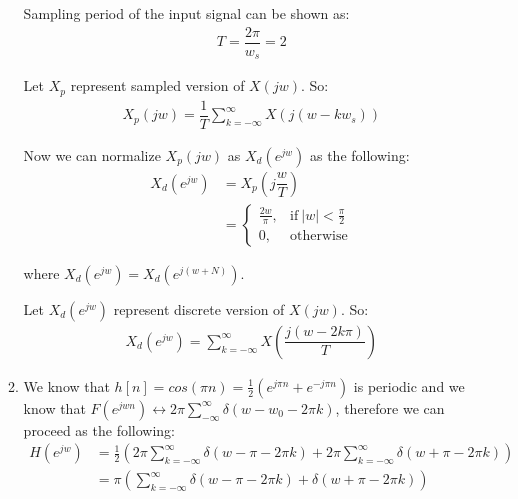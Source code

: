 \documentclass[10pt,a4paper, margin=1in]{article}
\begin{document}
\begin{enumerate}
\begin{enumerate}
    Sampling period of the input signal can be shown as: \\
    \begin{align*}
    T = \dfrac{2\pi}{w_s} = 2
    \end{align*}
    
    Let $X_p$ represent sampled version of $X(jw)$. So:
    \begin{align*}
    X_p(jw) = \dfrac{1}{T}\sum_{k = - \infty}^{\infty} X(j(w - kw_s))
    \end{align*}
    
    Now we can normalize $X_p(jw)$ as $X_d(e^{jw})$ as the following:
    \begin{align*}
    X_d(e^{jw}) &= X_p(j\dfrac{w}{T}) \\
                &= \begin{cases}
                       \frac{2w}{\pi}, & \text{if}\ |w| < \frac{\pi}{2} \\
                       0, & \text{otherwise}
                   \end{cases} 
    \end{align*}
    \begin{center}
    where $X_d(e^{jw}) = X_d(e^{j(w + N)})$. \\
    \end{center}
	Let $X_d(e^{jw})$ represent discrete version of $X(jw)$. So:
    \begin{align*}
    X_d(e^{jw}) = \sum_{k = - \infty}^{\infty} X\left( \dfrac{j(w - 2k\pi)}{T} \right)
    \end{align*}
   
    \item We know that $h[n] = cos(\pi n) = \frac{1}{2}(e^{j\pi n} + e^{-j\pi n})$ is periodic and we know that $F(e^{jwn}) \leftrightarrow 2\pi \sum_{-\infty}^{\infty} \delta(w-w_0-2\pi k)$, therefore we can proceed as the following: \\
    \begin{align*}
    H(e^{jw}) &= \frac{1}{2} \left( 2\pi \sum_{k = - \infty}^{\infty} \delta (w - \pi -2\pi k) + 2\pi \sum_{k = - \infty}^{\infty} \delta (w + \pi - 2\pi k) \right) \\
    &= \pi \left( \sum_{k = - \infty}^{\infty} \delta (w - \pi - 2\pi k) + \delta (w + \pi - 2\pi k) \right)
    \end{align*}
    

\end{enumerate}
\end{enumerate}
\end{document}
